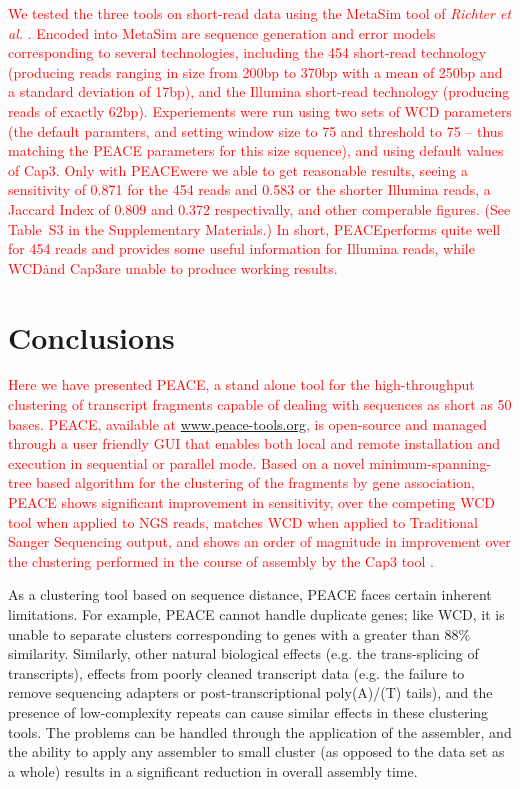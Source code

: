 \documentclass[a4,center,fleqn]{NAR}
\newcommand{\mc}[1]{\textcolor{red}{#1}}
\newcommand{\peace} {{\small PEACE}}
\newcommand{\wcd} {{\small WCD}}
\newcommand{\capthree} {{\small Cap3}}
\newcommand{\metasim} {{\small MetaSim}}
\begin{document}
\mc{We tested the three tools on short-read data using the \metasim\/
  tool of {\it Richter et al.} \cite{Richter2008}.  Encoded into
  \metasim\/ are sequence generation and error models corresponding to
  several technologies, including the 454 short-read technology
  (producing reads ranging in size from 200bp to 370bp with a mean of
  250bp and a standard deviation of 17bp), and the Illumina short-read
  technology (producing reads of exactly 62bp).  Experiements were run
  using two sets of \wcd\/ parameters (the default paramters, and
  setting window size to 75 and threshold to 75 -- thus matching the
  \peace\/ parameters for this size squence), and using default values
  of \capthree.  Only with \peace were we able to get reasonable
  results, seeing a sensitivity of 0.871 for the 454 reads and
  0.583 or the shorter Illumina reads, a Jaccard Index of 0.809 and
  0.372 respectivally, and other comperable figures.  (See Table~S3 in
  the Supplementary Materials.)  In short, \peace performs quite well
  for 454 reads and provides some useful information for Illumina
  reads, while \wcd\. and \capthree are unable to produce working
  results.}

\section{Conclusions}

\mc{Here we have presented \peace, a stand alone tool for the
  high-throughput clustering of transcript fragments capable of
  dealing with sequences as short as 50 bases.  \peace\/, available at
  \href{http://www.peace-tools.org}{www.peace-tools.org}, is
  open-source and managed through a user friendly GUI that enables
  both local and remote installation and execution in sequential or
  parallel mode.  Based on a novel minimum-spanning-tree based
  algorithm for the clustering of the fragments by gene association,
  \peace\/ shows significant improvement in sensitivity, over the
  competing \wcd\/ tool \cite{Hazelhurst08a} when applied to NGS
  reads, matches \wcd\/ when applied to Traditional Sanger Sequencing
  output, and shows an order of magnitude in improvement over the
  clustering performed in the course of assembly by the \capthree\/
  tool \cite{Huang99}.}

As a clustering tool based on sequence distance, \peace\/ faces
certain inherent limitations. For example, \peace\/ cannot handle
duplicate genes; like \wcd\/, it is unable to separate clusters
corresponding to genes with a greater than 88\% similarity.
Similarly, other natural biological effects (e.g. the trans-splicing of
transcripts), effects from poorly cleaned transcript data (e.g. the
failure to remove sequencing adapters or post-transcriptional
poly(A)/(T) tails), and the presence of low-complexity repeats can
cause similar effects in these clustering tools.  The problems can be
handled through the application of the assembler, and the ability to
apply any assembler to small cluster (as opposed to the data set as a
whole) results in a significant reduction in overall assembly time.
\end{document}
